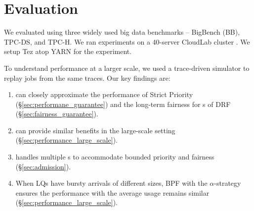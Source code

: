 \section{Evaluation}

We evaluated \name using three widely used big data benchmarks -- BigBench (BB), TPC-DS, and TPC-H. We ran experiments on a 40-server CloudLab cluster \cite{cloudlab}. We setup Tez atop YARN for the experiment. 

To understand performance at a larger scale, we used a trace-driven simulator to replay jobs from the same traces. Our key findings are:

\begin{enumerate}
\item \name can closely approximate the \burstq performance of Strict Priority (\S\ref{sec:performane_guarantee}) and the long-term fairness for {\batchq}s of DRF (\S\ref{sec:fairness_guarantee}).

\item \name can provide similar benefits in the large-scale setting (\S\ref{sec:performance_large_scale}).

\item \name handles multiple {\burstq}s to accommodate bounded priority and fairness (\S\ref{sec:admission}).

\item  When LQs have bursty arrivals of different sizes, BPF with the $\alpha$-strategy ensures the performance with the average usage remains similar (\S\ref{sec:performance_large_scale}).

\end{enumerate}



